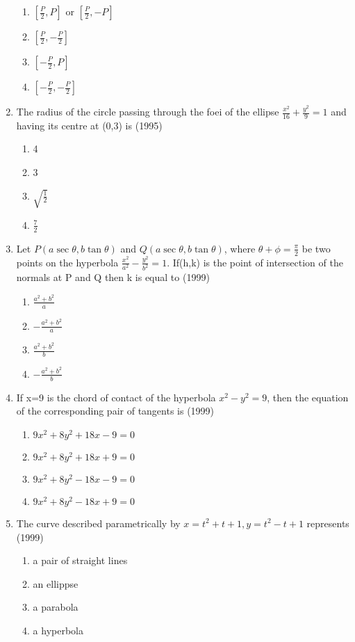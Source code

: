 \documentclass[12pt]{article}
\providecommand{\sbrak}[1]{\ensuremath{{}\left[#1\right]}}
\begin{document}
\begin{enumerate}
\begin{enumerate}
\item $\sbrak{\frac{P}{2},P}$ or $\sbrak{\frac{P}{2},-P}$
\item $\sbrak{\frac{P}{2},-\frac{P}{2}}$
\item $\sbrak{-\frac{P}{2},P}$
\item $\sbrak{-\frac{P}{2},-\frac{P}{2}}$
\end{enumerate}
\item The radius of the circle passing through the foei of the ellipse $\frac{x^2}{16}+\frac{y^2}{9}=1$ and having its centre at (0,3) is (1995)
\begin{enumerate}
\item 4
\item 3
\item $\sqrt{\frac{1}{2}}$
\item $\frac{7}{2}$
\end{enumerate}
\item Let $P(a\sec\theta,b\tan\theta)$ and $Q(a\sec\theta,b\tan\theta)$, where $\theta+\phi=\frac{\pi}{2}$  be two points on the hyperbola $\frac{x^2}{a^2}-\frac{y^2}{b^2}=1$. If(h,k) is the point of intersection of the normals at P and Q then k is equal to (1999)
\begin{enumerate}
\item $\frac{a^2+b^2}{a}$
\item $-\frac{a^2+b^2}{a}$
\item $\frac{a^2+b^2}{b}$
\item $-\frac{a^2+b^2}{b}$
\end{enumerate}
\item If x=9 is the chord of contact of the hyperbola $x^2-y^2=9$, then the equation of the corresponding pair of tangents  is (1999)
\begin{enumerate}
\item $9x^2+8y^2+18x-9=0$
\item $9x^2+8y^2+18x+9=0$
\item $9x^2+8y^2-18x-9=0$
\item $9x^2+8y^2-18x+9=0$
\end{enumerate}
\item The curve described parametrically by $x=t^2+t+1,y=t^2-t+1$ represents  (1999)
\begin{enumerate}
\item a pair of straight lines
\item an ellippse 
\item a parabola
\item a hyperbola

\end{enumerate}
\end{enumerate}
\end{document}
